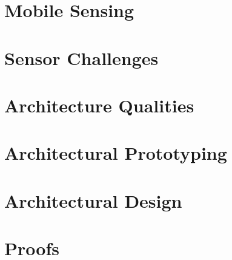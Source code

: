 \documentclass[a4paper]{report}
\theoremstyle{plain}
\begin{document}
    
    
    
    
    
    
    

\chapter{Mobile Sensing} 
    
    
\chapter{Sensor Challenges}
    
        

\chapter{Architecture Qualities}
    
    
\chapter{Architectural Prototyping}
    

\chapter{Architectural Design}
    








\clearpage
\appendix
{}
\chapter{Proofs}

\end{document}
